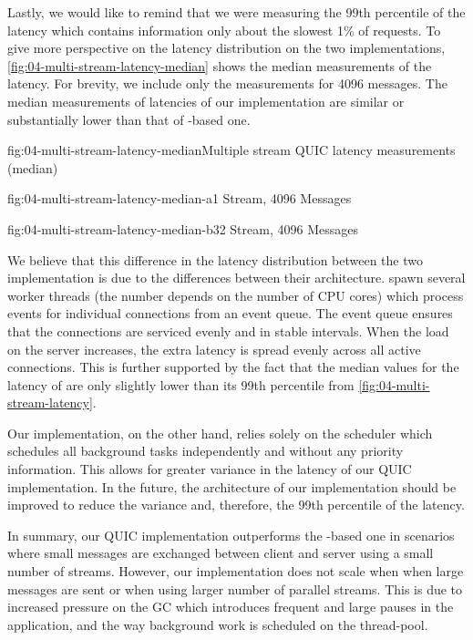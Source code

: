 Lastly, we would like to remind that we were measuring the 99th percentile of the latency which
contains information only about the slowest 1\% of requests. To give more perspective on the latency
distribution on the two implementations, \autoref{fig:04-multi-stream-latency-median} shows the
median measurements of the latency. For brevity, we include only the measurements for
\SI{4096}{\byte} messages. The median measurements of latencies of our implementation are similar or
substantially lower than that of \libmsquic{}-based one.

\begin{myFigure}{fig:04-multi-stream-latency-median}{Multiple stream QUIC latency measurements (median)}
\begin{mySubfigure}{0.49\linewidth}{fig:04-multi-stream-latency-median-a}{1 Stream, \SI{4096}{\byte} Messages}
\footnotesize

\end{mySubfigure}
\begin{mySubfigure}{0.49\linewidth}{fig:04-multi-stream-latency-median-b}{32 Stream, \SI{4096}{\byte} Messages}
\footnotesize

\end{mySubfigure}
\end{myFigure}

We believe that this difference in the latency distribution between the two implementation is due to
the differences between their architecture. \libmsquic{} spawn several worker threads (the number
depends on the number of CPU cores) which process events for individual connections from an event
queue. The event queue ensures that the connections are serviced evenly and in stable intervals.
When the load on the server increases, the extra latency is spread evenly across all active
connections. This is further supported by the fact that the median values for the latency of
\libmsquic{} are only slightly lower than its 99th percentile from
\autoref{fig:04-multi-stream-latency}.

Our implementation, on the other hand, relies solely on the \dotnet{}  scheduler which
schedules all background tasks independently and without any priority information. This allows for
greater variance in the latency of our QUIC implementation. In the future, the architecture of our
implementation should be improved to reduce the variance and, therefore, the 99th percentile of the
latency.

In summary, our QUIC implementation outperforms the \libmsquic{}-based one in scenarios where small
messages are exchanged between client and server using a small number of streams. However, our
implementation does not scale when when large messages are sent or when using larger number of
parallel streams. This is due to increased pressure on the GC which introduces frequent and large
pauses in the application, and the way background work is scheduled on the \dotnet{} thread-pool.

